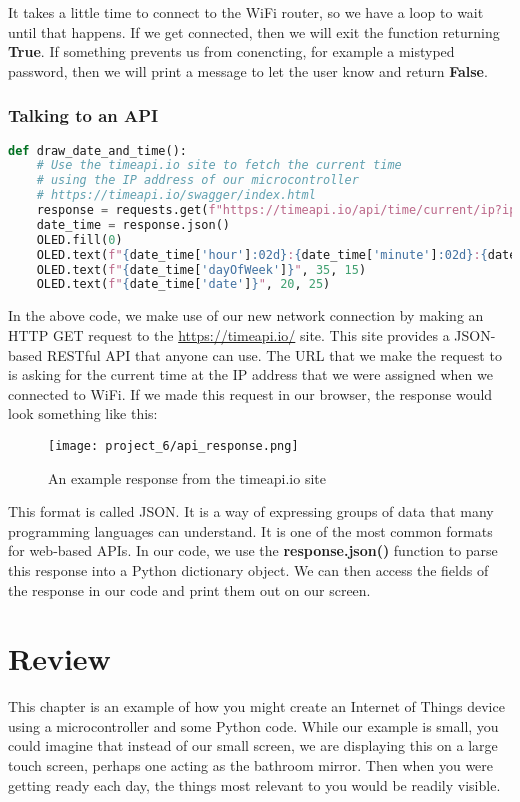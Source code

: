 It takes a little time to connect to the WiFi router, so we have a loop to wait until that happens. If we
get connected, then we will exit the function returning \textbf{True}. If something prevents us from conencting,
for example a mistyped password, then we will print a message to let the user know and return \textbf{False}.

\subsubsection{Talking to an API}
\begin{lstlisting}[language=Python,caption=Making Web Requests]
def draw_date_and_time():
    # Use the timeapi.io site to fetch the current time
    # using the IP address of our microcontroller
    # https://timeapi.io/swagger/index.html
    response = requests.get(f"https://timeapi.io/api/time/current/ip?ipAddress={IP_ADDRESS}")
    date_time = response.json()
    OLED.fill(0)
    OLED.text(f"{date_time['hour']:02d}:{date_time['minute']:02d}:{date_time['seconds']:02d}", 30, 5)
    OLED.text(f"{date_time['dayOfWeek']}", 35, 15)
    OLED.text(f"{date_time['date']}", 20, 25)
\end{lstlisting}

In the above code, we make use of our new network connection by making an HTTP GET request to the \url{https://timeapi.io/}
site. This site provides a JSON-based RESTful API that anyone can use. The URL that we make the request to is
asking for the current time at the IP address that we were assigned when we connected to WiFi. If we made this request
in our browser, the response would look something like this:

\begin{figure}[H]
    \centering
    \texttt{[image: project\_6/api\_response.png]}
    \caption{An example response from the timeapi.io site}
\end{figure}

This format is called JSON. It is a way of expressing groups of data that many programming languages can
understand. It is one of the most common formats for web-based APIs. In our code, we use the \textbf{response.json()}
function to parse this response into a Python dictionary object. We can then access the fields of the response in
our code and print them out on our screen.

\section{Review}
This chapter is an example of how you might create an Internet of Things device using a microcontroller and
some Python code. While our example is small, you could imagine that instead of our small screen, we are
displaying this on a large touch screen, perhaps one acting as the bathroom mirror. Then when you were getting
ready each day, the things most relevant to you would be readily visible.

